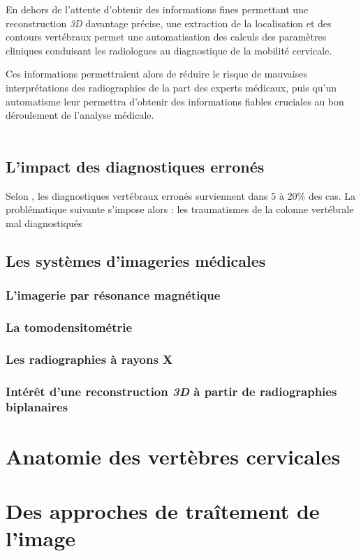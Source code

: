     En dehors de l'attente d'obtenir des informations fines permettant une reconstruction {\itshape 3D} davantage précise, une extraction de la localisation et des contours vertébraux permet une automatisation des calculs des paramètres cliniques conduisant les radiologues au diagnostique de la mobilité cervicale.

    Ces informations permettraient alors de réduire le risque de mauvaises interprétations des radiographies de la part des experts médicaux, puis qu'un automatisme leur permettra d'obtenir des informations fiables cruciales au bon déroulement de l'analyse médicale.
    \\\\

    \subsection{L'impact des diagnostiques erronés}

    Selon \cite{Platzer2006}, les diagnostiques vertébraux erronés surviennent dans $5$ à $20\%$ des cas. La problématique suivante s'impose alors : les traumatismes de la colonne vertébrale mal diagnostiqués
    \subsection{Les systèmes d'imageries médicales}
        \subsubsection{L'imagerie par résonance magnétique}
        \subsubsection{La tomodensitométrie}
        \subsubsection{Les radiographies à rayons X}
        \subsubsection{Intérêt d'une reconstruction {\itshape 3D} à partir de radiographies biplanaires}
\section{Anatomie des vertèbres cervicales}
\section{Des approches de traîtement de l'image}
